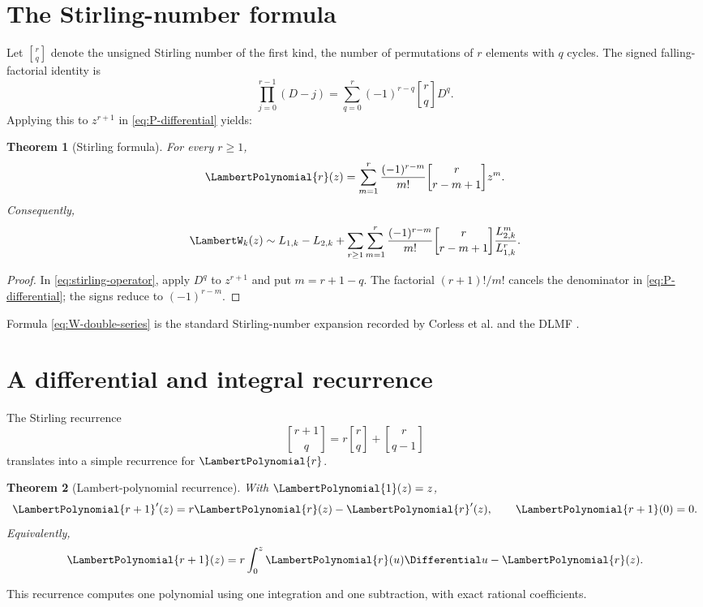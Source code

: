 \documentclass[11pt,oneside]{book}
\newtheorem{theorem}{Theorem}[chapter]
\theoremstyle{definition}
\theoremstyle{remark}
\newcommand{\stirlingone}[2]{\genfrac{[}{]}{0pt}{}{#1}{#2}}
\begin{document}
\section{The Stirling-number formula}
Let $\stirlingone{r}{q}$ denote the unsigned Stirling number of the first kind,
the number of permutations of $r$ elements with $q$ cycles.  The signed
falling-factorial identity is
\begin{equation}\label{eq:stirling-operator}
 \prod_{j=0}^{r-1}(D-j)
 =\sum_{q=0}^{r}(-1)^{r-q}\stirlingone{r}{q}D^q.
\end{equation}
Applying this to $z^{r+1}$ in \eqref{eq:P-differential} yields:

\begin{theorem}[Stirling formula]\label{thm:P-stirling}
For every $r\ge1$,
\begin{equation}\label{eq:P-stirling}
 \LambertPolynomial{r}(z)=\sum_{m=1}^{r}
 \frac{(-1)^{r-m}}{m!}
 \stirlingone{r}{r-m+1}z^m.
\end{equation}
Consequently,
\begin{equation}\label{eq:W-double-series}
 \LambertW_k(z)\sim L_{1,k}-L_{2,k}
 +\sum_{r\ge1}\sum_{m=1}^{r}
 \frac{(-1)^{r-m}}{m!}
 \stirlingone{r}{r-m+1}
 \frac{L_{2,k}^m}{L_{1,k}^r}.
\end{equation}
\end{theorem}
\begin{proof}
In \eqref{eq:stirling-operator}, apply $D^q$ to $z^{r+1}$ and put
$m=r+1-q$.  The factorial $(r+1)!/m!$ cancels the denominator in
\eqref{eq:P-differential}; the signs reduce to $(-1)^{r-m}$.
\end{proof}

Formula \eqref{eq:W-double-series} is the standard Stirling-number expansion
recorded by Corless et al. and the DLMF \cite{Corless1996,DLMF413}.

\section{A differential and integral recurrence}
The Stirling recurrence
\[
 \stirlingone{r+1}{q}=r\stirlingone{r}{q}
 +\stirlingone{r}{q-1}
\]
translates into a simple recurrence for $\LambertPolynomial{r}$.

\begin{theorem}[Lambert-polynomial recurrence]\label{thm:P-recurrence}
With $\LambertPolynomial{1}(z)=z$,
\begin{equation}\label{eq:P-differential-recurrence}
 {\LambertPolynomial{r+1}}'(z)=r\LambertPolynomial{r}(z)-{\LambertPolynomial{r}}'(z),
 \qquad \LambertPolynomial{r+1}(0)=0.
\end{equation}
Equivalently,
\begin{equation}\label{eq:P-integral-recurrence}
 \LambertPolynomial{r+1}(z)=r\int_0^z\LambertPolynomial{r}(u)\Differential u-\LambertPolynomial{r}(z).
\end{equation}
\end{theorem}
This recurrence computes one polynomial using one integration and one
subtraction, with exact rational coefficients.
\end{document}

